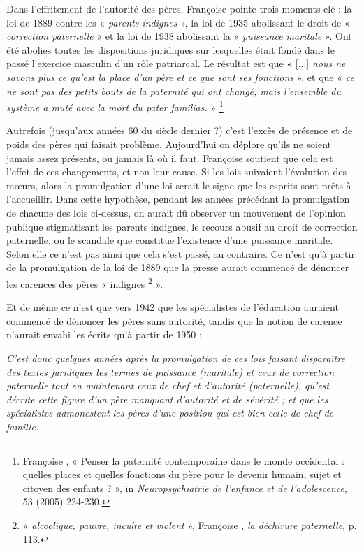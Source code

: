  Dans l'effritement de l'autorité des pères, Françoise  pointe trois moments clé : la loi de 1889 contre les « \emph{parents indignes} », la loi de 1935 abolissant le droit de « \emph{correction paternelle} » et la loi de 1938 abolissant la « \emph{puissance maritale} ». Ont été abolies toutes les dispositions juridiques sur lesquelles était fondé dans le passé l'exercice masculin d'un rôle patriarcal. Le résultat est que « [...] \emph{nous ne savons plus ce qu'est la place d'un père et ce que sont ses fonctions} », et que « \emph{ce ne sont pas des petits bouts de la paternité qui ont changé, mais l'ensemble du système a muté avec la mort du \emph{pater familias}.} »%
\footnote{Françoise , « Penser la paternité contemporaine dans le monde occidental : quelles places et quelles fonctions du père pour le devenir humain, sujet et citoyen des enfants ? », in \emph{Neuropsychiatrie de l'enfance et de l'adolescence}, 53 (2005) 224-230.} 

 Autrefois (jusqu'aux années 60 du siècle dernier ?) c'est l'excès de présence et de poids des pères qui faisait problème. Aujourd'hui on déplore qu'ils ne soient jamais assez présents, ou jamais là où il faut. Françoise  soutient que cela est l'effet de ces changements, et non leur cause. Si les lois suivaient l'évolution des mœurs, alors la promulgation d'une loi serait le signe que les esprits sont prêts à l'accueillir. Dans cette hypothèse, pendant les années précédant la promulgation de chacune des lois ci-dessus, on aurait dû observer un mouvement de l'opinion publique stigmatisant les parents indignes, le recours abusif au droit de correction paternelle, ou le scandale que constitue l'existence d'une puissance maritale. Selon elle ce n'est pas ainsi que cela s'est passé, au contraire. Ce n'est qu'à partir de la promulgation de la loi de 1889 que la presse aurait commencé de dénoncer les carences des pères « indignes%
\footnote{« \emph{alcoolique, pauvre, inculte et violent} », Françoise , \emph{la déchirure paternelle}, p. 113.} 
 ».

 Et de même ce n'est que vers 1942 que les spécialistes de l'éducation auraient commencé de dénoncer les pères sans autorité, tandis que la notion de carence n'aurait envahi les écrits qu'à partir de 1950 :
 
\begin{displayquote}
\emph{C'est donc quelques années après la promulgation de ces lois faisant disparaître des textes juridiques les termes de puissance (maritale) et ceux de correction paternelle tout en maintenant ceux de chef et d'autorité (paternelle), qu'est décrite cette figure d'un père manquant d'autorité et de sévérité ; et que les spécialistes admonestent les pères d'une position qui est bien celle de chef de famille.}
\end{displayquote}


